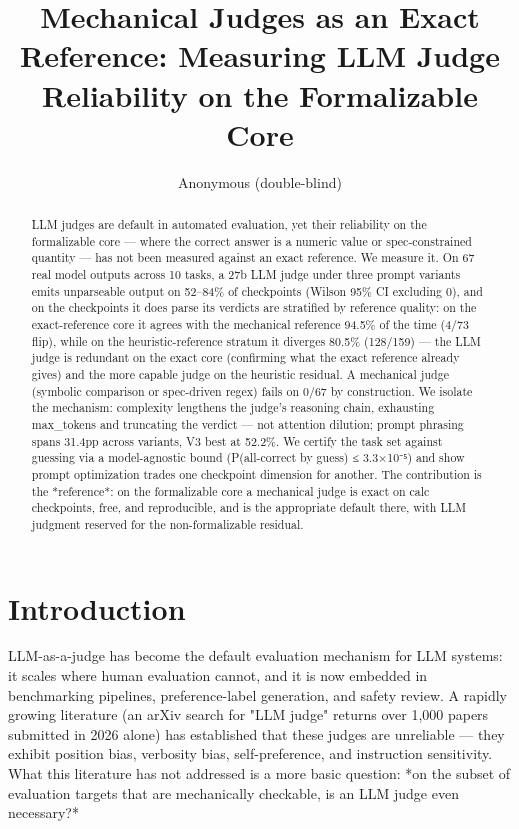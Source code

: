 \documentclass[10pt,twocolumn]{article}
\title{\textbf{Mechanical Judges as an Exact Reference: Measuring LLM Judge Reliability on the Formalizable Core}}
\author{Anonymous (double-blind)}
\date{}
\begin{document}
\maketitle
\begin{abstract}
LLM judges are default in automated evaluation, yet their reliability on the formalizable core — where the correct answer is a numeric value or spec-constrained quantity — has not been measured against an exact reference. We measure it. On 67 real model outputs across 10 tasks, a 27b LLM judge under three prompt variants emits unparseable output on 52–84\% of checkpoints (Wilson 95\% CI excluding 0), and on the checkpoints it does parse its verdicts are stratified by reference quality: on the exact-reference core it agrees with the mechanical reference 94.5\% of the time (4/73 flip), while on the heuristic-reference stratum it diverges 80.5\% (128/159) — the LLM judge is redundant on the exact core (confirming what the exact reference already gives) and the more capable judge on the heuristic residual. A mechanical judge (symbolic comparison or spec-driven regex) fails on 0/67 by construction. We isolate the mechanism: complexity lengthens the judge's reasoning chain, exhausting max\_tokens and truncating the verdict — not attention dilution; prompt phrasing spans 31.4pp across variants, V3 best at 52.2\%. We certify the task set against guessing via a model-agnostic bound (P(all-correct by guess) ≤ 3.3×10⁻⁵) and show prompt optimization trades one checkpoint dimension for another. The contribution is the *reference*: on the formalizable core a mechanical judge is exact on calc checkpoints, free, and reproducible, and is the appropriate default there, with LLM judgment reserved for the non-formalizable residual.
\end{abstract}

\section{Introduction}
LLM-as-a-judge has become the default evaluation mechanism for LLM systems: it scales where human evaluation cannot, and it is now embedded in benchmarking pipelines, preference-label generation, and safety review. A rapidly growing literature (an arXiv search for "LLM judge" returns over 1,000 papers submitted in 2026 alone) has established that these judges are unreliable — they exhibit position bias, verbosity bias, self-preference, and instruction sensitivity. What this literature has not addressed is a more basic question: *on the subset of evaluation targets that are mechanically checkable, is an LLM judge even necessary?*
\end{document}
